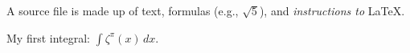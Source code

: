 \documentclass{amsart}
\begin{document}
A source file is made up of text, formulas (e.g.,
$\sqrt{5}$), and \emph{instructions to} \LaTeX.

\begin{center}
My first integral: $\int \zeta^\pi(x) \, dx$.
\end{center}
\end{document}
